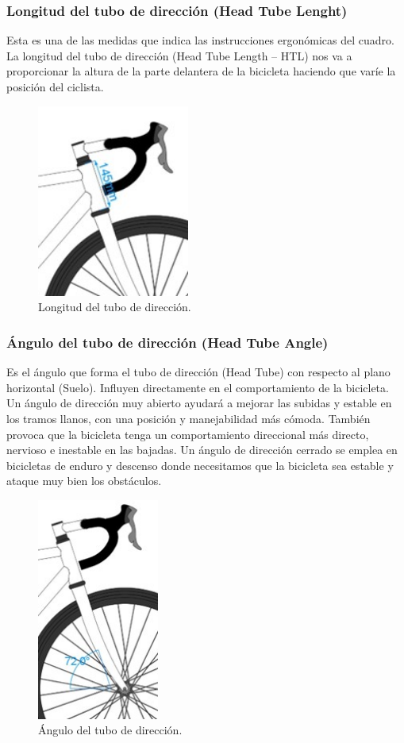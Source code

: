 \documentclass{article}
\begin{document}
\subsubsection{Longitud del tubo de dirección (Head Tube Lenght)}
Esta es una de las medidas que indica las instrucciones ergonómicas del cuadro. \\
La longitud del tubo de dirección (Head Tube Length – HTL) nos va a proporcionar la altura de la parte delantera de la bicicleta haciendo que varíe la posición del ciclista. 
\begin{figure} [htp]%
    \centering
    \includegraphics[width=50mm]{Imagen4.jpg} %
    \caption{Longitud del tubo de dirección.}
    \label{grafica}
\end{figure}

\subsubsection{Ángulo del tubo de dirección (Head Tube Angle)}
Es el ángulo que forma el tubo de dirección (Head Tube) con respecto al plano horizontal (Suelo). Influyen directamente en el comportamiento de la bicicleta. Un ángulo de dirección muy abierto ayudará a mejorar las subidas y estable en los tramos llanos, con una posición y manejabilidad más cómoda. También provoca que la bicicleta tenga un comportamiento direccional más directo, nervioso e inestable en las bajadas. Un ángulo de dirección cerrado se emplea en bicicletas de enduro y descenso donde necesitamos que la bicicleta sea estable y ataque muy bien los obstáculos. 
\begin{figure} [htp]%
    \centering
    \includegraphics[width=40mm]{Imagen5.jpg} %
    \caption{Ángulo del tubo de dirección.}
    \label{grafica}
\end{figure}
\newpage
\end{document}
